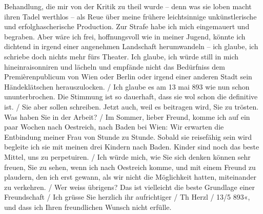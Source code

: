 {{{                        Behandlung, die mir von der Kritik zu theil wurde – denn was sie loben macht
                        ihren Tadel werthlos – als Reue über meine frühere leichtsinnige
                        unkünstlerische und erfolghascherische Production. Zur Strafe habe ich mich
                        eingemauert und begraben. Aber wäre ich frei, hoffnungsvoll wie in meiner
                        Jugend, könnte ich dichtend in irgend einer angenehmen Landschaft
                        herumwandeln – ich glaube, ich schriebe doch nichts mehr fürs Theater. Ich
                        glaube, ich würde still in mich hineinraisonniren und lächeln und empfände
                        nicht das Bedürfniss dem Premièrenpublicum von Wien oder Berlin oder irgend
                        einer anderen Stadt sein Händeklätschen herauszulocken.{ / }Ich glaube es am 13 mai 893 wie nun schon
                        ununterbrochen. Die
                        Stimmung ist so dauerhaft, dass sie wol schon die definitive ist. { / }Sie aber sollen schreiben. Jetzt auch, weil es beitragen wird, Sie zu
                        trösten. Was haben Sie in der Arbeit?{ / }Im Sommer, lieber Freund, komme ich auf ein paar Wochen nach Oestreich, nach Baden bei Wien: Wir
                        erwarten die Entbindung meiner Frau von Stunde zu Stunde. Sobald sie reisefähig
                        sein wird begleite ich sie mit meinen drei Kindern nach
                           Baden. Kinder sind noch das beste
                        Mittel, uns zu perpetuiren. { / }Ich würde mich, wie Sie sich denken können sehr freuen, Sie zu sehen, wenn
                        ich nach Oestreich komme, und mit einem
                        Freund zu plaudern, den ich erst gewann, als wir nicht die Möglichkeit
                        hatten, miteinander zu verkehren. { / }Wer weiss übrigens? Das ist vielleicht die beste Grundlage einer
                        Freundschaft{ / }Ich grüsse Sie herzlich ihr aufrichtiger{ / }Th Herzl{ / }13/5 893«}}}\label{K_L03829-1}, und dass ich Ihren freundlichen Wunsch nicht erfülle.\pend
           
